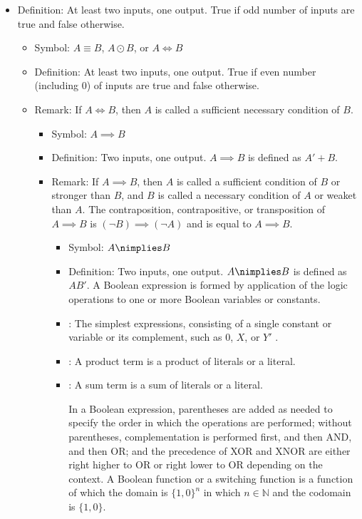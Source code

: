 \documentclass[a4paper,12pt]{article}
\begin{document}
\begin{itemize}
\begin{itemize}
\begin{itemize}
\begin{itemize}
\begin{itemize}
\begin{itemize}
\item Definition: At least two inputs, one output. True if odd number of inputs are true and false otherwise.
\eit
{}
\begin{itemize}
\item Symbol: $A\equiv B$, $A\odot B$, or $A\iff B$
\item Definition: At least two inputs, one output. True if even number (including 0) of inputs are true and false otherwise.
\item Remark: If $A \iff B$, then $A$ is called a sufficient necessary condition of $B$.
\eit
{}
\begin{itemize}
\item Symbol: $A \implies B$
\item Definition: Two inputs, one output. $A\implies B$ is defined as $A'+B$.
\item Remark: If $A \implies B$, then $A$ is called a sufficient condition of $B$ or stronger than $B$, and $B$ is called a necessary condition of $A$ or weaket than $A$. The contraposition, contrapositive, or transposition of $A\implies B$ is $(\neg B)\implies (\neg A)$ and is equal to $A\implies B$.
\eit
{}
\begin{itemize}
\item Symbol: $A\nimplies B$
\item Definition: Two inputs, one output. $A\nimplies B$ is defined as $AB'$.
\eit
{}
A Boolean expression is formed by application of the logic operations to one or more Boolean variables or constants. 

\bit
\item{}: The simplest expressions, consisting of a single constant or variable or its complement, such as $0$, $X$, or $Y′$ .
\item{}: A product term is a product of literals or a literal.
\item{}: A sum term is a sum of literals or a literal.
\eit

In a Boolean expression, parentheses are added as needed to specify the order in which the operations are performed; without parentheses, complementation is performed first, and then AND, and then OR; and the precedence of XOR and XNOR are either right higher to OR or right lower to OR depending on the context.
A Boolean function or a switching function is a function of which the domain is $\{1,0\}^n$ in which $n\in\mathbb{N}$ and the codomain is $\{1,0\}$.


\end{itemize}
\end{itemize}
\end{itemize}
\end{itemize}
\end{itemize}
\end{itemize}
\end{itemize}
\end{itemize}
\end{itemize}
\end{document}
